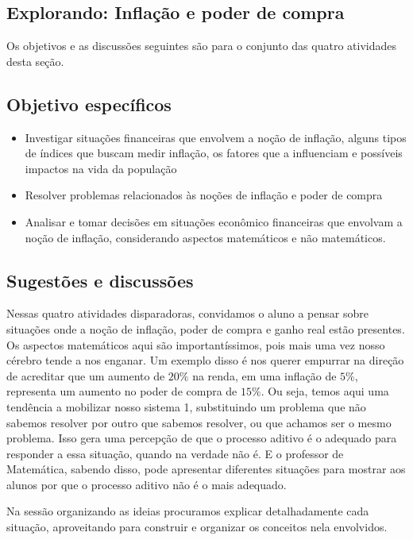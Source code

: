 \def\currentcolor{session1}
\begin{texto}
{
  \section{Explorando: Inflação e poder de compra}

  Os objetivos e as discussões seguintes são para o conjunto das quatro atividades desta seção.

  \subsection{Objetivo específicos}
  \begin{itemize}
  \item Investigar situações financeiras que envolvem a noção de inflação, alguns tipos de índices que buscam medir inflação, os fatores que a influenciam e possíveis impactos na vida da população
  \item Resolver problemas relacionados às noções de inflação e poder de compra
  \item Analisar e tomar decisões em situações econômico financeiras que envolvam a noção de inflação, considerando aspectos matemáticos e não matemáticos.
  \end{itemize}

  \subsection{Sugestões e discussões}

  Nessas quatro atividades disparadoras, convidamos o aluno a pensar sobre situações onde a noção de inflação, poder de compra e ganho real estão presentes. Os aspectos matemáticos aqui são importantíssimos, pois mais uma vez nosso cérebro tende a nos enganar. Um exemplo disso é nos querer empurrar na direção de acreditar que um aumento de $20\%$ na renda, em uma inflação de $5\%$, representa um aumento no poder de compra de $15\%$. Ou seja, temos aqui uma tendência a mobilizar nosso sistema 1, substituindo um problema que não sabemos resolver por outro que sabemos resolver, ou que achamos ser o mesmo problema. Isso gera uma percepção de que o processo aditivo é o adequado para responder a essa situação, quando na verdade não é. E o professor de Matemática, sabendo disso, pode apresentar diferentes situações para mostrar aos alunos por que o processo aditivo não é o mais adequado.

  Na sessão organizando as ideias procuramos explicar detalhadamente cada situação, aproveitando para construir e organizar os conceitos nela envolvidos.

}
\end{texto}
